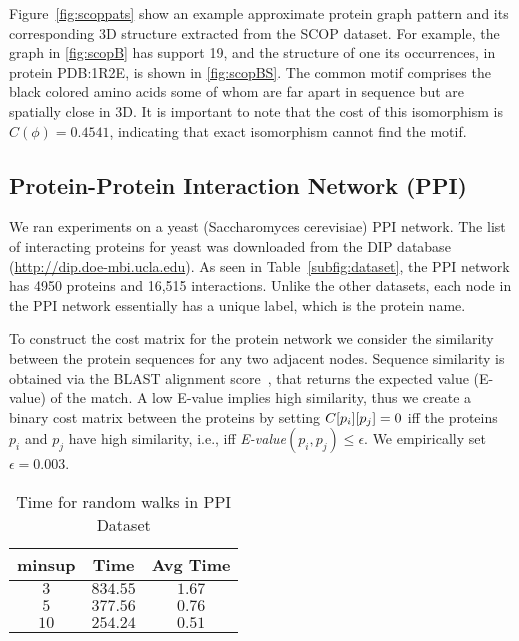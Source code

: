 \smallskip{}
Figure~\ref{fig:scoppats} show an example approximate protein graph
pattern and its corresponding 3D structure extracted from the SCOP
dataset.  
For example, the graph in \ref{fig:scopB} has support 19, and the
structure of one its occurrences, in protein PDB:1R2E, is shown in
\ref{fig:scopBS}. The common motif comprises the black colored amino
acids some of whom are far apart in sequence but are spatially close in 3D.
It is important to note that the cost of this isomorphism
is $C(\phi) = 0.4541$, indicating that exact isomorphism cannot find the
motif.

\subsection{Protein-Protein Interaction Network (PPI)} We ran
experiments on a yeast (Saccharomyces cerevisiae) PPI network. The list of
interacting proteins for yeast was downloaded from the DIP database
(\url{http://dip.doe-mbi.ucla.edu}). As seen in
Table~\ref{subfig:dataset}, the
PPI network has 4950 proteins and 16,515 interactions.  Unlike the other
datasets, each node in the PPI network essentially has a unique label,
which is the protein name.  

\smallskip{} 
To construct the cost matrix for the protein network we consider the
similarity between the protein sequences for any two adjacent nodes.
Sequence similarity is obtained via the BLAST alignment
score~\cite{altschul90}, that returns the expected value (E-value) of
the match. A low E-value implies high similarity, thus we create a
binary cost matrix between the proteins by setting
${C}[p_i][p_j] =0$ iff the proteins $p_i$ and $p_j$ have high
similarity, i.e., iff {\em E-value}$(p_i, p_j) \le \epsilon$. We empirically 
set $\epsilon = 0.003$.


\begin{table}[!h]
\centering
\begin{tabular}{|c|c|c|}
        \hline
        minsup & Time & Avg Time \\
		\hline
        $3$ & $834.55$ & $1.67$ \\
        $5$ & $377.56$ & $0.76$ \\
        $10$ & $254.24$ & $0.51$ \\
		\hline
    \end{tabular}
    \caption{Time for random walks in PPI Dataset }
\label{tab:ppi}
\end{table}


